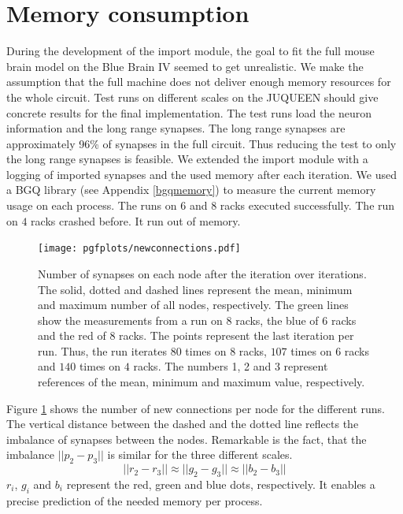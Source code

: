 \section{Memory consumption}
During the development of the import module, the goal to fit the full mouse brain model on the
Blue Brain IV seemed to get unrealistic. We make the assumption that the full machine does not deliver enough memory resources for the whole circuit.
Test runs on different scales on the JUQUEEN should give concrete results for the final implementation.
The test runs load the neuron information and the long range synapses.
The long range synapses are approximately 96\% of synapses in the full circuit.
Thus reducing the test to only the long range synapses is feasible.
We extended the import module with a logging of imported synapses and the used memory after each iteration.
We used a BGQ library (see Appendix \ref{bgqmemory}) to measure the current memory usage on each process.
The runs on $6$ and $8$ racks executed successfully.
The run on $4$ racks crashed before.
It run out of memory.
\begin{figure}[h!]
\begin{center}
 \texttt{[image: pgfplots/newconnections.pdf]}
\end{center}
\caption{Number of synapses on each node after the iteration over iterations.
The solid, dotted and dashed lines represent the mean, minimum and maximum number of all nodes, respectively.
The green lines show the measurements from a run on 8 racks, the blue of 6 racks and the red of 8 racks.
The points represent the last iteration per run.
Thus, the run iterates $80$ times on $8$ racks, $107$ times on $6$ racks and $140$ times on $4$ racks.
The numbers 1, 2 and 3 represent references of the mean, minimum and maximum value, respectively.
 }
\label{fig:newconnections}
\end{figure}
Figure \ref{fig:newconnections} shows the number of new connections per node for the different runs.
The vertical distance between the dashed and the dotted line reflects the imbalance of synapses between the nodes.
Remarkable is the fact, that the imbalance $||p_2-p_3||$ is similar for the three different scales.
\begin{equation}
	||r_2-r_3|| \approx ||g_2-g_3|| \approx ||b_2-b_3||
\end{equation}
$r_i$, $g_i$ and $b_i$ represent the red, green and blue dots, respectively.
It enables a precise prediction of the needed memory per process.
